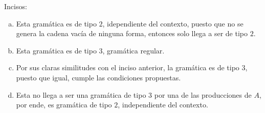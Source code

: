 \begin{mdframed}[style = warning]
	\begin{problem}
		Incisos:
			\begin{enumerate}[a)]
				\item Esta gramática es de tipo $2$, idependiente del contexto, puesto que no se genera la cadena vacía de ninguna forma, entonces solo llega a ser de tipo $2$.
				\item Esta gramática es de tipo $3$, gramática regular.
				\item Por sus claras similitudes con el inciso anterior, la gramática es de tipo $3$, puesto que igual, cumple las condiciones propuestas.
				\item Esta no llega a ser una gramática de tipo $3$ por una de las producciones de $A$, por ende, es gramática de tipo $2$, independiente del contexto. 
			\end{enumerate}
	\end{problem}
\end{mdframed}










